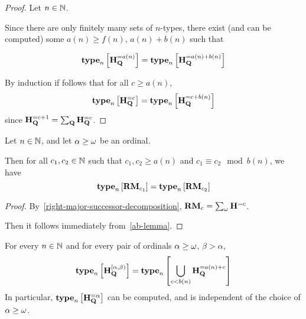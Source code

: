 \begin{proof}
    Let $n \in \mathbb{N}$.

    Since there are only finitely many sets of $n$-types,
    there exist (and can be computed)
    some $a(n) \ge f(n)$, $a(n) + b(n)$ such that

    \[
        \mathbf{type}_{n} \left[ {\mathbf{H}_{\mathbf{Q}}^{= a(n)}} \right] = \mathbf{type}_{n} \left[ {\mathbf{H}_{\mathbf{Q}}^{= a(n) + b(n)}} \right]
    \]

    By induction if follows that for all $c \ge a(n)$,
    \[
        \mathbf{type}_{n} \left[ {\mathbf{H}_{\mathbf{Q}}^{= c}} \right] = \mathbf{type}_{n} \left[ {\mathbf{H}_{\mathbf{Q}}^{= c + b(n)}} \right]
    \]
    since $\mathbf{H}_{\mathbf{Q}}^{= c + 1} = \sum_{\mathbf{Q}} \mathbf{H}_{\mathbf{Q}}^{= c}$.
\end{proof}

\begin{corollary}\label{right-major-computable}
    Let $n \in \mathbb{N}$, and let $\alpha \ge \omega$ be an ordinal.

    Then for all $c_1, c_2 \in \mathbb{N}$ such that $c_1, c_2 \ge a(n)$ and $c_1 \equiv c_2 \mod b(n)$,
    we have
    \[\mathbf{type}_{n} \left[ {\mathbf{RM}_{c_1}} \right] = \mathbf{type}_{n} \left[ {\mathbf{RM}_{c_2}} \right]\]
\end{corollary}

\begin{proof}
    By~\cref{right-major-successor-decomposition}, $\mathbf{RM}_{c} = \sum_{\omega}{\mathbf{H}_{}^{= c}}$.

    Then it follows immediately from~\cref{ab-lemma}.
\end{proof}

\begin{lemma}
    For every $n \in \mathbb{N}$ and for every pair of ordinals $\alpha \ge \omega$,
    $\beta > \alpha$,
    \[
        \mathbf{type}_{n} \left[ {\mathbf{H}_{\mathbf{Q}}^{[\alpha, \beta)}} \right] = \mathbf{type}_{n} \left[ {\bigcup_{c < b(n)}{\mathbf{H}_{\mathbf{Q}}^{= a(n) + c}}} \right]
    \]
    In particular, $\mathbf{type}_{n} \left[ {\mathbf{H}_{\mathbf{Q}}^{= \alpha}} \right]$ can be computed,
    and is independent of the choice of $\alpha \ge \omega$.
\end{lemma}


